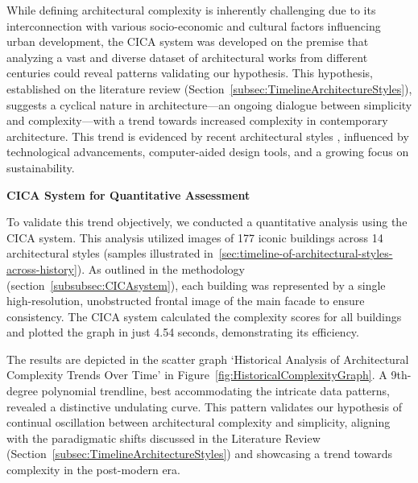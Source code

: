 %    


While defining architectural complexity is inherently challenging due to its interconnection with various socio-economic and cultural factors influencing urban development, the CICA system was developed on the premise that analyzing a vast and diverse dataset of architectural works from different centuries could reveal patterns validating our hypothesis.
This hypothesis, established on the literature review (Section~\ref{subsec:TimelineArchitectureStyles}), suggests a cyclical nature in architecture—an ongoing dialogue between simplicity and complexity—with a trend towards increased complexity in contemporary architecture.
This trend is evidenced by recent architectural styles , influenced by technological advancements, computer-aided design tools, and a growing focus on sustainability.

\textbf{CICA System for Quantitative Assessment}


To validate this trend objectively, we conducted a quantitative analysis using the CICA system.
This analysis utilized images of 177 iconic buildings across 14 architectural styles (samples illustrated in~\ref{sec:timeline-of-architectural-styles-across-history}). As outlined in the methodology (section~\ref{subsubsec:CICAsystem}), each building was represented by a single high-resolution, unobstructed frontal image of the main facade to ensure consistency.
The CICA system calculated the complexity scores for all buildings and plotted the graph in just 4.54 seconds, demonstrating its efficiency.


The results are depicted in the scatter graph `Historical Analysis of Architectural Complexity Trends Over Time' in Figure~\ref{fig:HistoricalComplexityGraph}.
A 9th-degree polynomial trendline, best accommodating the intricate data patterns, revealed a distinctive undulating curve.
This pattern validates our hypothesis of continual oscillation between architectural complexity and simplicity, aligning with the paradigmatic shifts discussed in the Literature Review (Section~\ref{subsec:TimelineArchitectureStyles}) and showcasing a trend towards complexity in the post-modern era.

